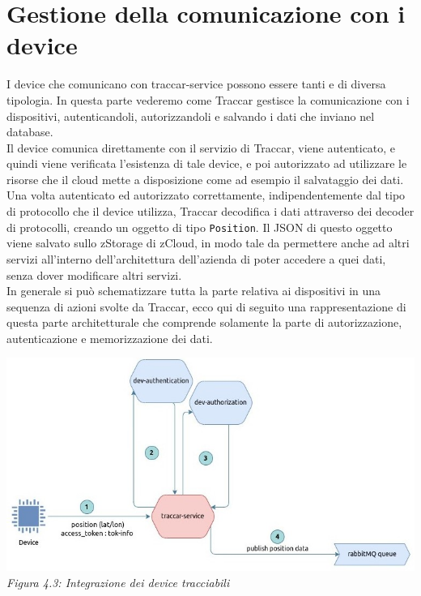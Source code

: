 \documentclass[a4paper,titlepage,12pt]{report}
\begin{document}
{\section{
Gestione della comunicazione con i device}
I device che comunicano con traccar-service possono essere tanti e di diversa tipologia. In questa parte vederemo come Traccar gestisce la comunicazione con i dispositivi, autenticandoli, autorizzandoli e salvando i dati che inviano nel database.\\
Il device comunica direttamente con il servizio di Traccar, viene autenticato, e quindi viene verificata l'esistenza di tale device, e poi autorizzato ad utilizzare le risorse che il cloud mette a disposizione come ad esempio il salvataggio dei dati. Una volta autenticato ed autorizzato correttamente, indipendentemente dal tipo di protocollo che il device utilizza, Traccar decodifica i dati attraverso dei decoder di protocolli, creando un oggetto di tipo \texttt{Position}. Il JSON di questo oggetto viene salvato sullo zStorage di zCloud, in modo tale da permettere anche ad altri servizi all'interno dell'architettura dell'azienda di poter accedere a quei dati, senza dover modificare altri servizi.\\
In generale si può schematizzare tutta la parte relativa ai dispositivi in una sequenza di azioni svolte da Traccar, ecco qui di seguito una rappresentazione di questa parte architetturale che comprende solamente la parte di autorizzazione, autenticazione e memorizzazione dei dati.

\begin{center}

\includegraphics[scale=0.56]{images/dev-aut-traccar.jpg}\\ 
\textit{Figura 4.3: Integrazione dei device tracciabili}
\end{center}

}
\end{document}
